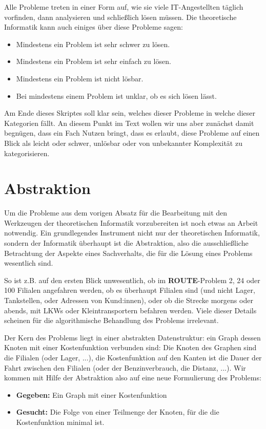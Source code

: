 Alle Probleme treten in einer Form auf,
wie sie viele IT-Angestellten täglich vorfinden, dann analysieren und schließlich lösen müssen.
Die theoretische Informatik kann auch einiges über diese Probleme sagen:
\begin{itemize}
    \item Mindestens ein Problem ist sehr schwer zu lösen.
    \item Mindestens ein Problem ist sehr einfach zu lösen.
    \item Mindestens ein Problem ist nicht lösbar. 
    \item Bei mindestens einem Problem ist unklar, ob es sich lösen lässt.
\end{itemize}

Am Ende dieses Skriptes soll klar sein, welches dieser Probleme in welche dieser Kategorien fällt.
An diesem Punkt im Text wollen wir uns aber zunächst damit begnügen,
dass ein Fach Nutzen bringt, dass es erlaubt, diese Probleme auf einen Blick als leicht oder
schwer, unlösbar oder von unbekannter Komplexität zu kategorisieren. 

\section{Abstraktion}

Um die Probleme aus dem vorigen Absatz für die Bearbeitung mit den Werkzeugen der
theoretischen Informatik vorzubereiten ist noch etwas an Arbeit notwendig.
Ein grundlegendes Instrument nicht nur der theoretischen Informatik, sondern der Informatik
überhaupt ist die Abstraktion, also die ausschließliche Betrachtung der Aspekte eines Sachverhalts,
die für die Lösung eines Problems wesentlich sind.

So ist z.B. auf den ersten Blick unwesentlich, ob im \textbf{ROUTE}-Problem 2, 24 oder 100 Filialen angefahren werden,
ob es überhaupt Filialen sind (und nicht Lager, Tankstellen, oder Adressen von Kund:innen),
oder ob die Strecke morgens oder abends,
mit LKWs oder Kleintransportern befahren werden.
Viele dieser Details scheinen für die algorithmische Behandlung des Problems irrelevant.

Der Kern des Problems liegt in einer abstrakten Datenstruktur:
ein Graph dessen Knoten mit einer Kostenfunktion verbunden sind:
Die Knoten des Graphen sind die Filialen (oder Lager, ...),
die Kostenfunktion auf den Kanten ist die Dauer der Fahrt zwischen den Filialen (oder der Benzinverbrauch, die Distanz, ...).
Wir kommen mit Hilfe der Abstraktion also auf eine neue Formulierung des Problems:
\begin{itemize}
    \item \textbf{Gegeben:} Ein Graph mit einer Kostenfunktion
    \item \textbf{Gesucht:} Die Folge von einer Teilmenge der Knoten, für die die Kostenfunktion minimal ist.
\end{itemize}

